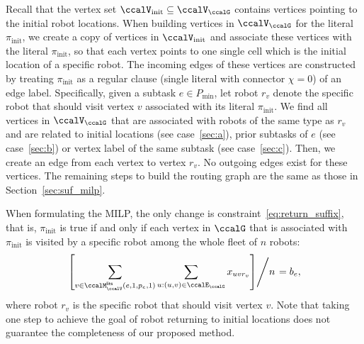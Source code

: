 \documentclass[Afour,sageh,times]{sagej}
\begin{document}
{{Recall that the vertex set $\ccalV_\text{init} \subseteq \ccalV_\ccalG$ contains vertices pointing to the initial robot locations. When building vertices in $\ccalV_\ccalG$ for the literal $\pi_{\text{init}}$, we create a copy of vertices in $\ccalV_{\text{init}}$ and associate these vertices  with the literal $\pi_{\text{init}}$, so that each vertex points to one single cell which is the initial location of a specific robot. The incoming edges of these vertices are constructed by treating $\pi_{\text{init}}$ as a regular clause (single literal with connector $\chi=0$) of an edge label. Specifically, given a subtask $e\in P_{\text{min}}$, let robot $r_v$ denote the specific robot that should visit vertex $v$ associated with its literal $\pi_{\text{init}}$. We find all vertices in $\ccalV_\ccalG$ that are associated with robots of the same type as $r_v$ and are related to initial locations (see case~\ref{sec:a}), prior subtasks of $e$ (see case~\ref{sec:b}) or vertex label of the same subtask (see case~\ref{sec:c}). Then, we create an edge from each vertex to vertex $r_v$. No outgoing edges exist for these vertices.  The remaining steps to build the routing graph are the same as those in Section~\ref{sec:suf_milp}.

When formulating the MILP, the only change is constraint~\eqref{eq:return_suffix}, that is, $\pi_{\text{init}}$ is true if and only if each vertex in $\ccalG$ that is associated with  $\pi_{\text{init}}$ is visited by a specific robot among the whole fleet of $n$ robots:
\begin{align}
  \left.   \left[ \sum_{v \in \ccalM_\ccalV^\mathsf{lits}(e, 1, p_e, 1)}   \sum_{u: (u,v) \in \ccalE_\ccalG}     x_{uvr_v} \right] \middle/ {n} \right. = b_e,
 \end{align}
where robot $r_v$ is the specific robot that should visit vertex $v$. Note that taking one step to achieve the goal of robot returning to initial locations  does not guarantee the completeness of our proposed method.

}}
\end{document}
